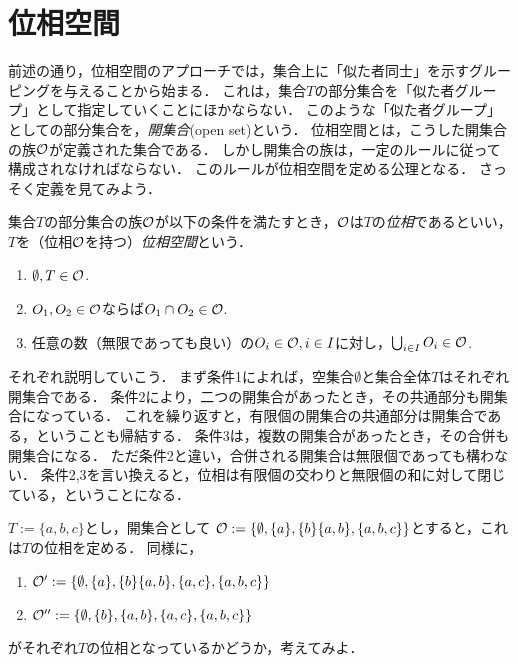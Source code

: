 \documentclass[11pt,a4paper]{jsarticle}
\begin{document}
\section{位相空間}

前述の通り，位相空間のアプローチでは，集合上に「似た者同士」を示すグルーピングを与えることから始まる．
これは，集合$T$の部分集合を「似た者グループ」として指定していくことにほかならない．
このような「似た者グループ」としての部分集合を，\emph{開集合}(open set)という．
位相空間とは，こうした開集合の族$\mathcal{O}$が定義された集合である．
しかし開集合の族は，一定のルールに従って構成されなければならない．
このルールが位相空間を定める公理となる．
さっそく定義を見てみよう．

\begin{dfn}[位相空間]
集合$T$の部分集合の族$\mathcal{O}$が以下の条件を満たすとき，$\mathcal{O}$は$T$の\emph{位相}であるといい，$T$を（位相$\mathcal{O}$を持つ）\emph{位相空間}という．
\begin{enumerate}
 \item $\emptyset, T \in \mathcal{O}$.
 \item $O_1, O_2 \in \mathcal{O}$ならば$O_1 \cap O_2 \in \mathcal{O}$.
 \item 任意の数（無限であっても良い）の$O_i \in \mathcal{O}, i \in I$に対し，$\bigcup_{i \in I} O_i \in \mathcal{O}$.
\end{enumerate}
\end{dfn}

それぞれ説明していこう．
まず条件1によれば，空集合$\emptyset$と集合全体$T$はそれぞれ開集合である．
条件2により，二つの開集合があったとき，その共通部分も開集合になっている．
これを繰り返すと，有限個の開集合の共通部分は開集合である，ということも帰結する．
条件3は，複数の開集合があったとき，その合併も開集合になる．
ただ条件2と違い，合併される開集合は無限個であっても構わない．
条件2,3を言い換えると，位相は有限個の交わりと無限個の和に対して閉じている，ということになる．

\begin{example}
\label{topologyex}
$T:=\{a, b, c\}$とし，開集合として
$\mathcal{O} := \{ \emptyset, \{a \}, \{b\} \{a,b\}, \{a,b,c\} \}$とすると，これは$T$の位相を定める．
同様に，
\begin{enumerate}
\item $\mathcal{O}' := \{ \emptyset, \{a \}, \{b\} \{a,b\}, \{a, c\}, \{a,b,c\} \}$
\item $\mathcal{O}'' := \{ \emptyset, \{b\}, \{a,b\}, \{a, c\}, \{a,b,c\} \}$
\end{enumerate}
がそれぞれ$T$の位相となっているかどうか，考えてみよ．
\end{example}
\end{document}
